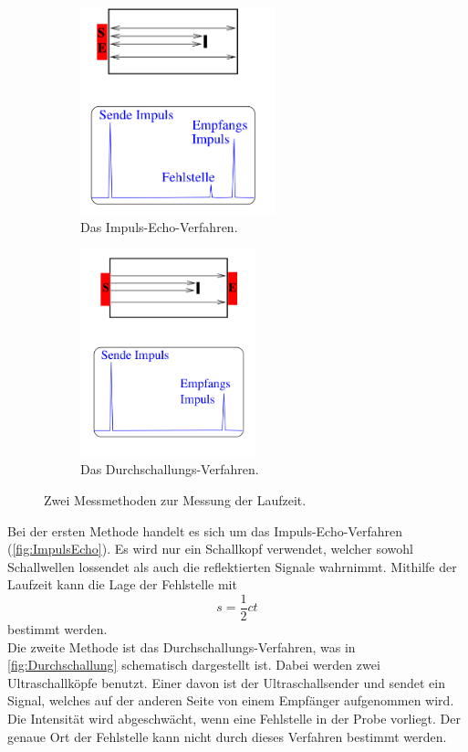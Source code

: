 \begin{figure}[H]
    \begin{subfigure}{0.48\textwidth}
       \centering
       \includegraphics[height=6cm]{build/Impuls_Echo.png}
       \caption{Das Impuls-Echo-Verfahren.}
       \label{fig:ImpulsEcho}
    \end{subfigure}
    \hfill
    \begin{subfigure}{0.48\textwidth}    
        \centering
        \includegraphics[height=6cm]{build/Durchschall.png}
        \caption{Das Durchschallungs-Verfahren.}
        \label{fig:Durchschallung}
    \end{subfigure}
    \caption{Zwei Messmethoden zur Messung der Laufzeit\cite{VUS1}.}
    \label{fig:Methoden}
\end{figure}
Bei der ersten Methode handelt es sich um das Impuls-Echo-Verfahren (\autoref{fig:ImpulsEcho}). Es wird nur ein Schallkopf verwendet, welcher
sowohl Schallwellen lossendet als auch die reflektierten Signale wahrnimmt.
Mithilfe der Laufzeit kann die Lage der Fehlstelle mit
\begin{equation}
    s = \frac{1}{2} c t
    \label{eqn:Strecke}
\end{equation}
bestimmt werden.\\
Die zweite Methode ist das Durchschallungs-Verfahren, was in \autoref{fig:Durchschallung} schematisch dargestellt ist. 
Dabei werden zwei Ultraschallköpfe benutzt. Einer davon ist der Ultraschallsender und sendet ein Signal, welches auf der anderen Seite von
einem Empfänger aufgenommen wird. Die Intensität wird abgeschwächt, wenn eine Fehlstelle in der Probe vorliegt. Der genaue Ort der 
Fehlstelle kann nicht durch dieses Verfahren bestimmt werden.
